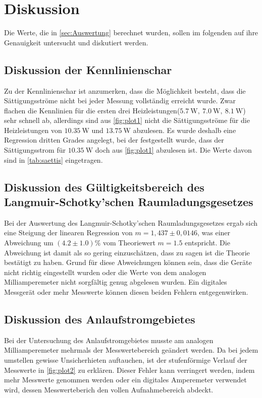 \newpage
\section{Diskussion}
\label{sec:Diskussion}

Die Werte, die in \autoref{sec:Auswertung} berechnet wurden, sollen im folgenden auf ihre Genauigkeit untersucht und diskutiert werden.

\subsection{Diskussion der Kennlinienschar}
\label{subsec:DiskKenn}
Zu der Kennlinienschar ist anzumerken, dass die Möglichkeit besteht, dass die Sättigungsströme nicht bei jeder Messung vollständig erreicht wurde.
Zwar flachen die Kennlinien für die ersten drei Heizleistungen($\SI{5,7}{\watt},\ \SI{7,0}{\watt},\ \SI{8,1}{\watt}$) sehr schnell ab, allerdings 
sind aus \autoref{fig:plot1} nicht die Sättigungsströme für die Heizleistungen von $\SI{10,35}{\watt}$ und $\SI{13,75}{\watt}$ abzulesen. Es wurde deshalb eine
Regression dritten Grades angelegt, bei der festgestellt wurde, dass der Sättigungsstrom für $\SI{10,35}{\watt}$ doch aus \autoref{fig:plot1} abzulesen ist.
Die Werte davon sind in \autoref{tab:saettis} eingetragen.

\subsection{Diskussion des Gültigkeitsbereich des Langmuir-Schotky'schen Raumladungsgesetzes}
\label{subsec:DiskLangmuir}
Bei der Auswertung des Langmuir-Schotky'schen Raumladungsgesetzes ergab sich eine Steigung der linearen Regression von $m = 1,437 \pm 0,0146$, was einer
Abweichung um $(4.2 \pm 1.0)\%$ vom Theoriewert $m = 1.5$ entspricht.
Die Abweichung ist damit als so gering einzuschätzen, dass zu sagen ist die Theorie bestätigt zu haben. \newline
Grund für diese Abweichungen können sein, dass die Geräte nicht richtig eingestellt wurden oder die Werte von dem analogen Milliamperemeter nicht sorgfältig genug abgelesen wurden. Ein digitales Messgerät oder mehr Messwerte können
diesen beiden Fehlern entgegenwirken.

\subsection{Diskussion des Anlaufstromgebietes}
\label{subsec:diskAnlauf}
Bei der Untersuchung des Anlaufstromgebietes musste am analogen Milliamperemeter mehrmals der Messwertebereich geändert werden. Da bei jedem umstellen gewisse Unsicherhieten auftauchen,
ist der stufenförmige Verlauf der Messwerte in \autoref{fig:plot2} zu erklären. Dieser Fehler kann verringert werden, indem mehr Messwerte genommen werden oder ein digitales
Amperemeter verwendet wird, dessen Messwerteberich den vollen Aufnahmebereich abdeckt.

